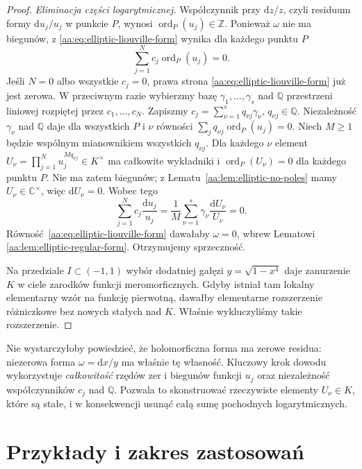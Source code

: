 \begin{proof}
\emph{Eliminacja części logarytmicznej.}
Współczynnik przy
$\mathrm dz/z$, czyli residuum
formy $\mathrm du_j/u_j$
w punkcie $P$, wynosi
$\operatorname{ord}_P(u_j)\in\mathbb Z$.
Ponieważ $\omega$ nie ma
biegunów, z
\eqref{aa:eq:elliptic-liouville-form}
wynika dla każdego punktu $P$
\[
 \sum_{j=1}^Nc_j\operatorname{ord}_P(u_j)=0.
\]
Jeśli $N=0$ albo wszystkie
$c_j=0$, prawa strona
\eqref{aa:eq:elliptic-liouville-form}
już jest zerowa.
W przeciwnym razie
wybierzmy bazę
$\gamma_1,\ldots,\gamma_s$
nad $\mathbb Q$
przestrzeni liniowej
rozpiętej przez
$c_1,\ldots,c_N$.
Zapiszmy
$c_j=\sum_{\nu=1}^s
q_{\nu j}\gamma_\nu$,
$q_{\nu j}\in\mathbb Q$.
Niezależność $\gamma_\nu$
nad $\mathbb Q$ daje
dla wszystkich $P$ i $\nu$
równości
$\sum_jq_{\nu j}\operatorname{ord}_P(u_j)=0$.
Niech $M\ge1$ będzie wspólnym
mianownikiem wszystkich
$q_{\nu j}$.
Dla każdego $\nu$ element
$U_\nu=\prod_{j=1}^N
u_j^{Mq_{\nu j}}\in K^\times$
ma całkowite wykładniki i
$\operatorname{ord}_P(U_\nu)=0$
dla każdego punktu $P$.
Nie ma zatem biegunów;
z Lematu~\ref{aa:lem:elliptic-no-poles}
mamy $U_\nu\in\mathbb C^\times$,
więc $\mathrm dU_\nu=0$.
Wobec tego
\[
 \sum_{j=1}^Nc_j\frac{\mathrm du_j}{u_j}
 =\frac1M\sum_{\nu=1}^s
       \gamma_\nu\frac{\mathrm dU_\nu}{U_\nu}
 =0.
\]
Równość~\eqref{aa:eq:elliptic-liouville-form}
dawałaby $\omega=0$,
wbrew Lematowi
\ref{aa:lem:elliptic-regular-form}.
Otrzymujemy sprzeczność.

Na przedziale $I\subset(-1,1)$
wybór dodatniej gałęzi
$y=\sqrt{1-x^4}$ daje
zanurzenie $K$ w ciele
zarodków funkcji meromorficznych.
Gdyby istniał tam lokalny
elementarny wzór na funkcję
pierwotną, dawałby
elementarne rozszerzenie
różniczkowe bez nowych
stałych nad $K$.
Właśnie wykluczyliśmy
takie rozszerzenie.
\end{proof}

\begin{uwaga}
\label{aa:uw:elliptic-residue-warning}
Nie wystarczyłoby powiedzieć,
że holomorficzna forma
ma zerowe residua:
niezerowa forma
$\omega=\mathrm dx/y$
ma właśnie tę własność.
Kluczowy krok dowodu
wykorzystuje \emph{całkowitość}
rzędów zer i biegunów funkcji
$u_j$ oraz niezależność
współczynników $c_j$
nad $\mathbb Q$.
Pozwala to skonstruować
rzeczywiste elementy $U_\nu\in K$,
które są stałe, i w konsekwencji
usunąć całą sumę
pochodnych logarytmicznych.
\end{uwaga}

\section{Przykłady i zakres zastosowań}

